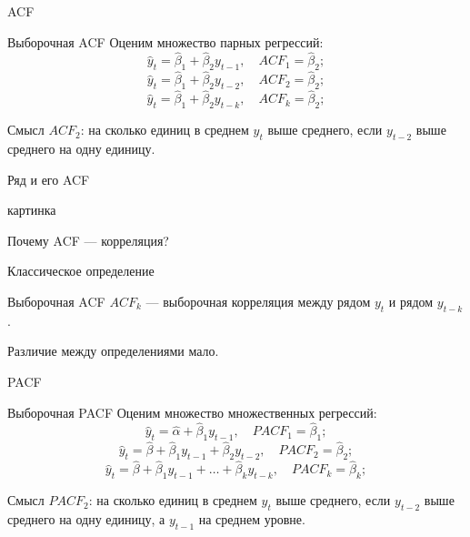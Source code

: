 \begin{frame}{ACF}

\begin{block}{Выборочная ACF}
  Оценим множество парных регрессий:
  \[
  \hat y_t = \hat\beta_1 + \hat\beta_2 y_{t-1}, \quad ACF_1 = \hat\beta_2;
  \]
  \pause
  \[
    \hat y_t = \hat\beta_1 + \hat\beta_2 y_{t-2}, \quad ACF_2 = \hat\beta_2;
  \]
  \pause
  \[
    \hat y_t = \hat\beta_1 + \hat\beta_2 y_{t-k}, \quad ACF_k = \hat\beta_2;
  \]
\end{block}

\pause
\alert{Смысл}
$ACF_2$: на сколько единиц в среднем $y_t$ выше среднего, если $y_{t-2}$ выше среднего на одну единицу.

\end{frame}


\begin{frame}{Ряд и его ACF}

картинка

\end{frame}

\begin{frame}{Почему ACF — корреляция?}

  \alert{Классическое определение}

  \begin{block}{Выборочная ACF}
    $ACF_k$ — выборочная корреляция между рядом $y_t$ и рядом $y_{t-k}$.
  \end{block}

\pause
Различие между определениями \alert{мало}. 

\end{frame}


\begin{frame}{PACF}

  \begin{block}{Выборочная PACF}
    Оценим множество множественных регрессий:
    \[
    \hat y_t = \hat\alpha + \hat\beta_1 y_{t-1}, \quad PACF_1 = \hat\beta_1;
    \]
    \pause
    \[
      \hat y_t = \hat\beta  + \hat\beta_1 y_{t-1} + \hat\beta_2 y_{t-2}, \quad PACF_2 = \hat\beta_2;
    \]
    \pause
    \[
      \hat y_t = \hat\beta + \hat\beta_1 y_{t-1} + \ldots + \hat\beta_k y_{t-k}, \quad PACF_k = \hat\beta_k;
    \]
  \end{block}
  
  \pause
  \alert{Смысл}
  $PACF_2$: на сколько единиц в среднем $y_t$ выше среднего, если $y_{t-2}$ выше среднего на одну единицу,
  а $y_{t-1}$ на среднем уровне.

  \end{frame}
  
